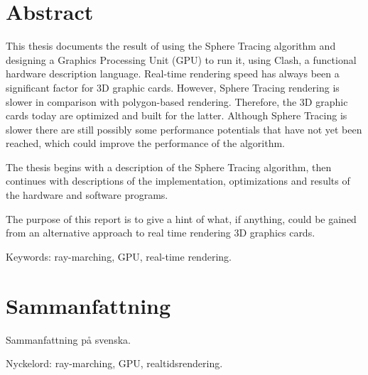 \thispagestyle{plain}			%
\setlength{\parskip}{0pt plus 1.0pt}
\section*{Abstract}
	
	This thesis documents the result of using the Sphere Tracing algorithm and
	designing a Graphics Processing Unit (GPU) to run it, using Clash, a
	functional hardware description language. Real-time rendering speed has
	always been a significant factor for 3D graphic cards. However, Sphere
	Tracing rendering is slower in comparison with polygon-based rendering.
	Therefore, the 3D graphic cards today are optimized and built for the
	latter. Although Sphere Tracing is slower there are still possibly some
	performance potentials that have not yet been reached, which could improve
	the performance of the algorithm.
	
	The thesis begins with a description of the Sphere Tracing algorithm, then
	continues with descriptions of the implementation, optimizations and results
	of the hardware and software programs.
	
	The purpose of this report is to give a hint of what, if anything, could be
	gained from an alternative approach to real time rendering 3D graphics
	cards.

	\vfill
	Keywords: ray-marching, GPU, real-time rendering.

\newpage
\thispagestyle{plain}

\section*{Sammanfattning}
	
	Sammanfattning på svenska.
	
	\vfill
	Nyckelord: ray-marching, GPU, realtidsrendering.


\newpage
\thispagestyle{empty}
\mbox{}
